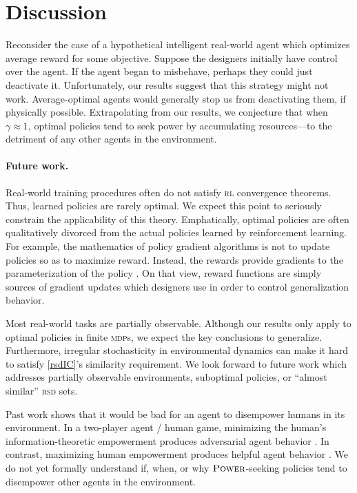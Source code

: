 \documentclass{article}
\newcommand*{\mdp}[1][m]{{\textsc{#1dp}}}
\newcommand*{\rsd}[1][r]{{\textsc{#1sd}}}
\newcommand*{\rl}[1][r]{{\textsc{#1l}}}
\theoremstyle{definition}
\begin{document}
\section{Discussion} \label{sec:discussion}
Reconsider the case of a hypothetical intelligent real-world agent which optimizes average reward for some objective. Suppose the designers initially have control over the agent. If the agent began to misbehave, perhaps they could just deactivate it. Unfortunately, our results suggest that this strategy might not work. Average-optimal agents would generally stop us from deactivating them, if physically possible. Extrapolating from our results, we conjecture that when $\gamma\approx 1$, optimal policies tend to seek power by accumulating resources—to the detriment of any other agents in the environment.

\paragraph{Future work.}
Real-world training procedures often do not satisfy {\rl} convergence theorems. Thus, learned policies are rarely optimal. We expect this point to seriously constrain the applicability of this theory. Emphatically, optimal policies are often qualitatively divorced from the actual policies learned by reinforcement learning. For example, the mathematics of policy gradient algorithms is not to update policies so as to maximize reward. Instead, the rewards provide gradients to the parameterization of the policy \citep{rewardNotOpt}. On that view, reward functions are simply sources of gradient updates which designers use in order to control generalization behavior. 

Most real-world tasks are partially observable. Although our results only apply to optimal policies in finite {\mdp}s, we expect the key conclusions to generalize. Furthermore, irregular stochasticity in environmental dynamics can make it hard to satisfy \cref{rsdIC}'s similarity requirement. We look forward to future work which addresses partially observable environments, suboptimal policies, or ``almost similar'' {\rsd} sets.  

Past work shows that it would be bad for an agent to disempower humans in its environment. In a two-player agent / human game, minimizing the human's information-theoretic empowerment \citep{salge_empowermentintroduction_2014} produces  adversarial agent behavior \citep{adversary}. In contrast,  maximizing human empowerment produces helpful agent behavior  \citep{salge2017empowerment, guckelsberger2016intrinsically,du2020ave}. We do not yet formally understand if, when, or why $\text{\upshape\textsc{Power}}$-seeking policies tend to disempower other agents in the environment.
\end{document}
